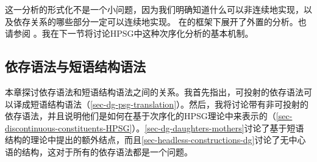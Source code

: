 这一分析的形式化不是一个小问题，因为我们明确知道什么可以非连续地实现，以及依存关系的哪些部分一定可以连续地实现。
 \citet{KP95a}在\hpsgc 的框架下展开了外置的分析。也请参阅 。我在下一节将讨论HPSG中这种次序化分析的基本机制。

\subsection{依存语法与短语结构语法}
\label{sec-dependency-vs-constituency}

本章探讨依存语法和短语结构语法之间的关系。我首先指出，可投射的依存语法可以译成短语结构语法（\ref{sec-dg-psg-translation}）。然后，我将讨论带有非可投射的依存语法，并且说明他们是如何在基于次序化的HPSG理论中来表示的（\ref{sec-discontinuous-constituents-HPSG}）。\ref{sec-dg-daughters-mothers}讨论了基于短语结构的理论中提出的额外结点，而且\ref{sec-headless-constructions-dg}讨论了无中心语的结构，这对于所有的依存语法都是一个问题。

